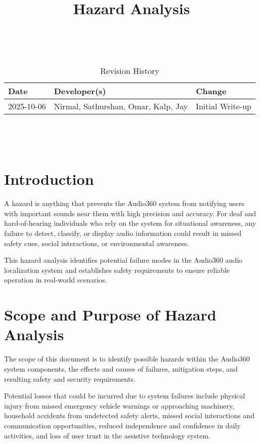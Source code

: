 \documentclass{article}
\title{Hazard Analysis\\\progname}
\author{\authname}
\date{}
\begin{document}
\maketitle
\thispagestyle{empty}

~\newpage


\begin{table}[hp]
\caption{Revision History} \label{TblRevisionHistory}
\begin{tabularx}{\textwidth}{llX}
\toprule
\textbf{Date} & \textbf{Developer(s)} & \textbf{Change}\\
\midrule
2025-10-06 &  Nirmal, Sathurshan, Omar, Kalp, Jay & Initial Write-up\\
\bottomrule
\end{tabularx}
\end{table}

~\newpage

\tableofcontents

~\newpage


\section{Introduction}

A hazard is anything that prevents the Audio360 system from notifying users with
important sounds near them with high precision and accuracy. For deaf and
hard-of-hearing individuals who rely on the system for situational awareness,
any failure to detect, classify, or display audio information could result in
missed safety cues, social interactions, or environmental awareness.

This hazard analysis identifies potential failure modes in the Audio360 audio 
localization system and establishes safety requirements to ensure reliable
operation in real-world scenarios.

\section{Scope and Purpose of Hazard Analysis}

The scope of this document is to identify possible hazards within the Audio360
system components, the effects and causes of failures, mitigation steps, and
resulting safety and security requirements.

Potential losses that could be incurred due to system failures include physical
injury from missed emergency vehicle warnings or approaching machinery,
household accidents from undetected safety alerts, missed social interactions
and communication opportunities, reduced independence and confidence in daily
activities, and loss of user trust in the assistive technology system.
\end{document}

